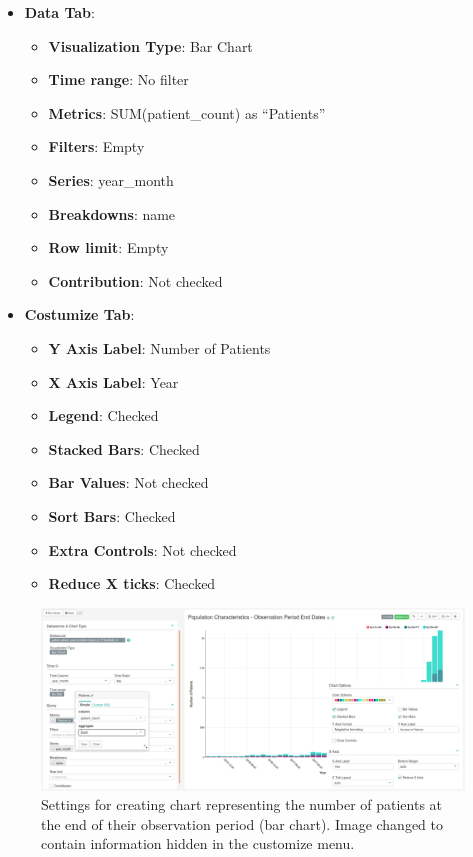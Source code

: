 \documentclass[]{book}
\providecommand{\tightlist}{%
  \setlength{\itemsep}{0pt}\setlength{\parskip}{0pt}}
\begin{document}
\begin{itemize}
\tightlist
\item
  \textbf{Data Tab}:

  \begin{itemize}
  \tightlist
  \item
    \textbf{Visualization Type}: Bar Chart
  \item
    \textbf{Time range}: No filter
  \item
    \textbf{Metrics}: SUM(patient\_count) as ``Patients''
  \item
    \textbf{Filters}: Empty
  \item
    \textbf{Series}: year\_month
  \item
    \textbf{Breakdowns}: name
  \item
    \textbf{Row limit}: Empty
  \item
    \textbf{Contribution}: Not checked
  \end{itemize}
\item
  \textbf{Costumize Tab}:

  \begin{itemize}
  \tightlist
  \item
    \textbf{Y Axis Label}: Number of Patients
  \item
    \textbf{X Axis Label}: Year
  \item
    \textbf{Legend}: Checked
  \item
    \textbf{Stacked Bars}: Checked
  \item
    \textbf{Bar Values}: Not checked
  \item
    \textbf{Sort Bars}: Checked
  \item
    \textbf{Extra Controls}: Not checked
  \item
    \textbf{Reduce X ticks}: Checked
  \end{itemize}
\end{itemize}

\begin{figure}
\includegraphics[width=1\linewidth]{images/populationCharacteristicsObservationPeriodEndDates} \caption{Settings for creating chart representing the number of patients at the end of their observation period (bar chart). Image changed to contain information hidden in the customize menu.}\label{fig:populationCharacteristicsObservationPeriodEndDates}
\end{figure}
\end{document}
